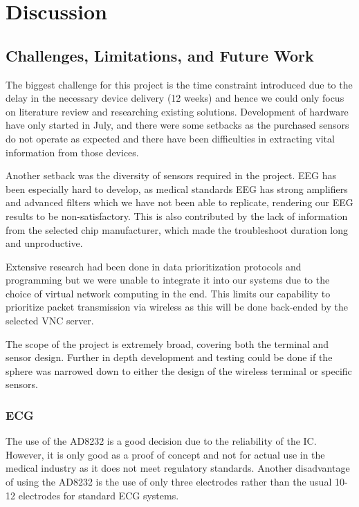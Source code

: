 \chapter{Discussion}

\section{Challenges, Limitations, and Future Work}

The biggest challenge for this project is the time constraint introduced due to the delay in the necessary device delivery (12 weeks) and hence we could only focus on literature review and researching existing solutions. Development of hardware have only started in July, and there were some setbacks as the purchased sensors do not operate as expected and there have been difficulties in extracting vital information from those devices. 

Another setback was the diversity of sensors required in the project. EEG has been especially hard to develop, as medical standards EEG has strong amplifiers and advanced filters which we have not been able to replicate, rendering our EEG results to be non-satisfactory. This is also contributed by the lack of information from the selected chip manufacturer, which made the troubleshoot duration long and unproductive. 

Extensive research had been done in data prioritization protocols and programming but we were unable to integrate it into our systems due to the choice of virtual network computing in the end. This limits our capability to prioritize packet transmission via wireless as this will be done back-ended by the selected VNC server.  

The scope of the project is extremely broad, covering both the terminal and sensor design. Further in depth development and testing could be done if the sphere was narrowed down to either the design of the wireless terminal or specific sensors.  

\subsection{ECG}

The use of the AD8232 is a good decision due to the reliability of the IC. However, it is only good as a proof of concept and not for actual use in the medical industry as it does not meet regulatory standards. Another disadvantage of using the AD8232 is the use of only three electrodes rather than the usual 10-12 electrodes for standard ECG systems. 


